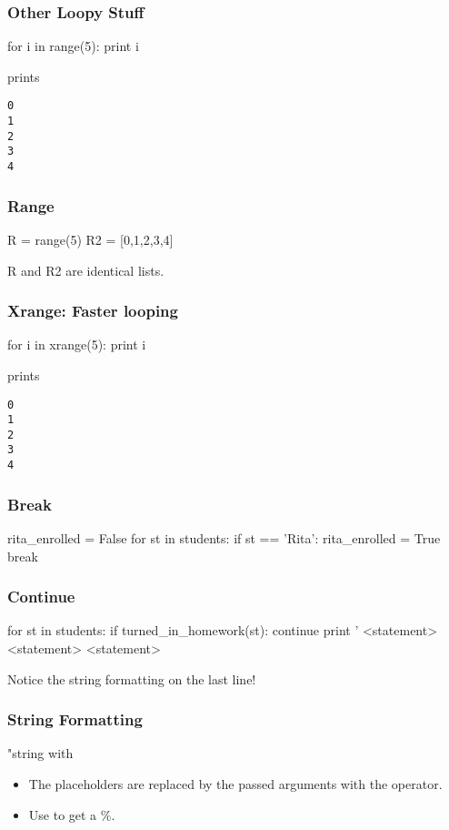 \begin{frame}[fragile]
\frametitle{Other Loopy Stuff}

\begin{python}
for i in range(5):
    print i
\end{python}

prints

\begin{verbatim}
0
1
2
3
4
\end{verbatim}
\end{frame}

\begin{frame}[fragile]
\frametitle{Range}
\begin{python}
R = range(5)
R2 = [0,1,2,3,4]
\end{python}

R and R2 are identical lists.
\end{frame}

\begin{frame}[fragile]
\frametitle{Xrange: Faster looping}
\begin{python}
for i in xrange(5):
    print i
\end{python}

prints

\begin{verbatim}
0
1
2
3
4
\end{verbatim}
\end{frame}

\begin{frame}[fragile]
\frametitle{Break}
\begin{python}
rita_enrolled = False
for st in students:
    if st == 'Rita':
        rita_enrolled = True
        break
\end{python}

\end{frame}

\begin{frame}[fragile]
\frametitle{Continue}
\begin{python}
for st in students:
    if turned_in_homework(st):
        continue
    print '%
    <statement>
    <statement>
    <statement>
\end{python}

Notice the string formatting on the last line!
\end{frame}

\begin{frame}[fragile]
\frametitle{String Formatting}
\begin{python}
"string with %
\end{python}

\begin{itemize}
\item The  placeholders are replaced by the passed arguments with the \code{\%} operator.
\item Use \code{\%\%} to get a \%.
\end{itemize}

\end{frame}

